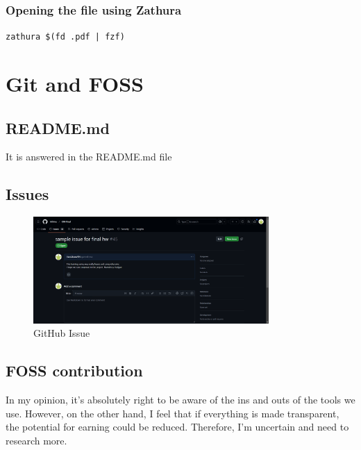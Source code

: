 \documentclass{article}
\begin{document}
    \subsubsection{Opening the file using Zathura}
            \hspace*{1cm} \texttt{zathura \$(fd .pdf | fzf)}

    
\section{Git and FOSS}
    \subsection{README.md}
        It is answered in the README.md file


    \subsection{Issues}
        \begin{figure}[h]
            \centering
            \includegraphics[width=0.8\textwidth]{hi.png}
            \caption{GitHub Issue}
        \end{figure}


        \subsection{FOSS contribution}
            In my opinion, it's absolutely right to be aware of the ins
            and outs of the tools we use. However, on the other hand, I
            feel that if everything is made transparent, the potential 
            for earning could be reduced. Therefore, I'm uncertain and 
            need to research more.
\end{document}

